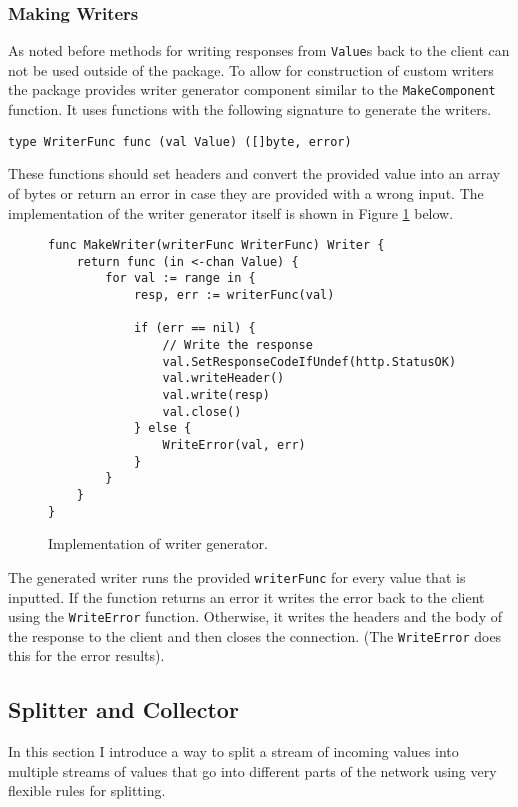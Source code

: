 \documentclass[12pt,a4paper]{article}
\begin{document}
\subsubsection{Making Writers}
As noted before methods for writing responses from \texttt{Value}s 
back to the client can not be used outside of the package. To allow
for construction of custom writers the package provides writer generator
component similar to the \texttt{MakeComponent} function. It uses 
functions with the following signature to generate the writers.
\begin{lstlisting}
type WriterFunc func (val Value) ([]byte, error)
\end{lstlisting}
These functions should set headers and convert the provided value into 
an array of bytes or return an error in case they are provided with a 
wrong input. The implementation of the writer generator itself is shown
in Figure \ref{fig:MakeWriter} below.
\begin{figure}[h]
\centering
\begin{lstlisting}
func MakeWriter(writerFunc WriterFunc) Writer {
    return func (in <-chan Value) {
        for val := range in {
            resp, err := writerFunc(val)

            if (err == nil) {
                // Write the response
                val.SetResponseCodeIfUndef(http.StatusOK)
                val.writeHeader()
                val.write(resp)
                val.close()
            } else {
                WriteError(val, err)
            }
        }       
    }
}
\end{lstlisting}
\caption[scale=1.0]{Implementation of writer generator.}
\label{fig:MakeWriter}
\end{figure}

The generated writer runs the provided \texttt{writerFunc} for every value 
that is inputted. If the function returns an error it writes the error 
back to the client using the \texttt{WriteError} function. Otherwise, it 
writes the headers and the body of the response to the client and then 
closes the connection. (The \texttt{WriteError} does this for the error
results).

\subsection{Splitter and Collector}
In this section I introduce a way to split a stream of incoming values into
multiple streams of values that go into different parts of the network
using very flexible rules for splitting.
\end{document}
